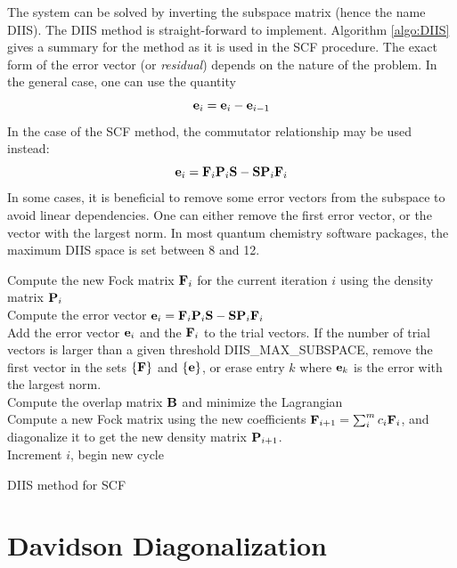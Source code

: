 \noindent The system can be solved by inverting the subspace matrix (hence the name DIIS). 
The DIIS method is straight-forward to implement. Algorithm \ref{algo:DIIS} gives a summary for the method as it is used in the SCF procedure. 
The exact form of the error vector (or \emph{residual}) depends on the nature of the problem. In the general case, one can use the quantity
\begin{equation}
\mathbf{e}_i = \mathbf{e}_i - \mathbf{e}_{i-1}
\end{equation}
\noindent In the case of the SCF method, the commutator relationship may be used instead:
\begin{equation}
\mathbf{e}_i = \mathbf{F}_i \mathbf{P}_i \mathbf{S} - \mathbf{S} \mathbf{P}_i \mathbf{F}_i 
\end{equation}
In some cases, it is beneficial to remove some error vectors from the subspace to avoid linear dependencies. One can either remove the first error vector, or the vector with the largest norm. In most quantum chemistry software packages, the maximum DIIS space is set between 8 and 12. 

\begin{algorithm}
Compute the new Fock matrix $\mathbf{F}_i$ for the current iteration $i$ using the density matrix $\mathbf{P}_i$
\\
Compute the error vector $\mathbf{e}_i = \mathbf{F}_i \mathbf{P}_i \mathbf{S} - \mathbf{S} \mathbf{P}_i \mathbf{F}_i$
\\
Add the error vector $\mathbf{e}_i$ and the $\mathbf{F}_i$ to the trial vectors. If the number of trial vectors is larger than a given threshold \textrm{DIIS\_MAX\_SUBSPACE}, remove  the first vector in the sets $\{\mathbf{F}\}$ and $\{\mathbf{e}\}$, or erase entry $k$ where $\mathbf{e}_k$ is the error with the largest norm.
\\
Compute the overlap matrix $\mathbf{B}$ and minimize the Lagrangian
\\
Compute a new Fock matrix using the new coefficients $\mathbf{F}_{i+1} = \sum_i^m c_i \mathbf{F}_i$, and diagonalize it to get the new density matrix $\mathbf{P}_{i+1}$. 
\\
Increment $i$, begin new cycle
\caption{DIIS method for SCF}
\label{algo:DIIS}
\end{algorithm} 

\section{Davidson Diagonalization \label{sec:DAV}}

